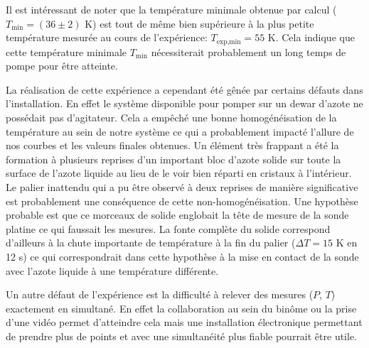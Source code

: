 Il est intéressant de noter que la température minimale obtenue par calcul (\(T_\textrm{min} = (36 \pm 2) \) \si{\kelvin}) est tout de même bien supérieure à la plus petite température mesurée au cours de l'expérience: \(T_\textrm{exp,min} = 55\) \si{\kelvin}. Cela indique que cette température minimale \(T_\textrm{min}\) nécessiterait probablement un long temps de pompe pour être atteinte.

La réalisation de cette expérience a cependant été gênée par certains défauts dans l'installation. En effet le système disponible pour pomper sur un dewar d'azote ne possédait pas d'agitateur. Cela a empêché une bonne homogénéisation de la température au sein de notre système ce qui a probablement impacté l'allure de nos courbes et les valeurs finales obtenues. Un élément très frappant a été la formation à plusieurs reprises d'un important bloc d'azote solide sur toute la surface de l'azote liquide au lieu de le voir bien réparti en cristaux à l'intérieur. Le palier inattendu qui a pu être observé à deux reprises de manière significative est probablement une conséquence de cette non-homogénéisation. Une hypothèse probable est que ce morceaux de solide englobait la tête de mesure de la sonde platine ce qui faussait les mesures. La fonte complète du solide correspond d'ailleurs à la chute importante de température à la fin du palier (\(\Delta T = 15\) \si{\kelvin} en 12 \si{\second}) ce qui correspondrait dans cette hypothèse à la mise en contact de la sonde avec l'azote liquide à une température différente.

Un autre défaut de l'expérience est la difficulté à relever des mesures (\(P\), \(T\)) exactement en simultané. En effet la collaboration au sein du binôme ou la prise d'une vidéo permet d'atteindre cela mais une installation électronique permettant de prendre plus de points et avec une simultanéité plus fiable pourrait être utile.
